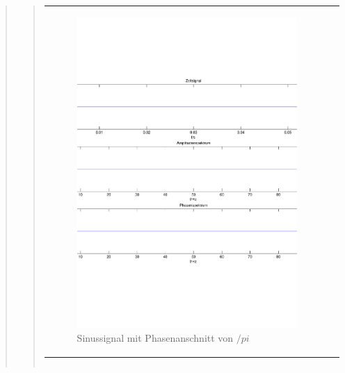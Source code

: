 \begin{quote}
\begin{quote}
\begin{center}
\begin{tabular}{ll}
            \hspace{-4em}
                \begin{minipage}{0.6\textwidth}

                    \begin{figure}[H]
                        \label{fig:}
                        \includegraphics[scale=0.3]{./Bilder/Phasenanschnitt88pi.pdf} %
                        \caption{Sinussignal mit Phasenanschnitt von $/pi$}
                    \end{figure}

                \end{minipage}

            \end{tabular}
            \end{center}
             \begin{center}
                 \begin{tabular}{|c|c|c|}
                             

\end{tabular}
\end{center}
\end{quote}
\end{quote}
